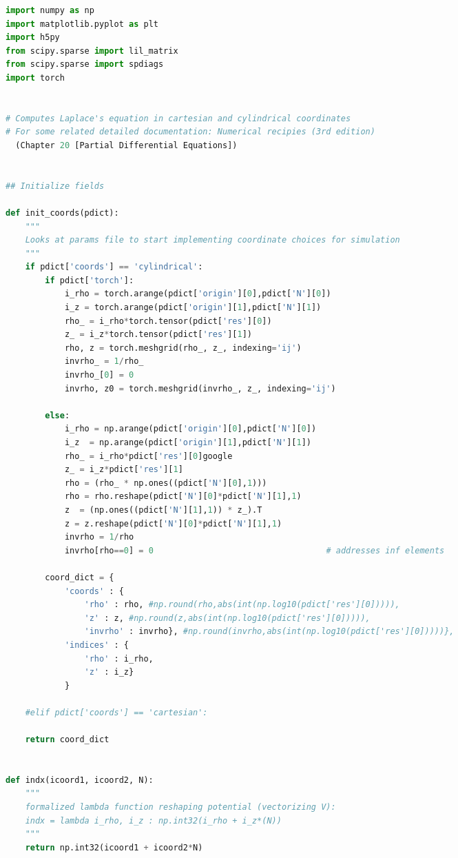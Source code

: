 \begin{spacing}{1}
\begin{lstlisting}[frame=single, language=Python]
import numpy as np
import matplotlib.pyplot as plt
import h5py
from scipy.sparse import lil_matrix
from scipy.sparse import spdiags
import torch


# Computes Laplace's equation in cartesian and cylindrical coordinates
# For some related detailed documentation: Numerical recipies (3rd edition) 
  (Chapter 20 [Partial Differential Equations])


## Initialize fields

def init_coords(pdict):
    """ 
    Looks at params file to start implementing coordinate choices for simulation
    """
    if pdict['coords'] == 'cylindrical':
        if pdict['torch']:
            i_rho = torch.arange(pdict['origin'][0],pdict['N'][0])
            i_z = torch.arange(pdict['origin'][1],pdict['N'][1])
            rho_ = i_rho*torch.tensor(pdict['res'][0])
            z_ = i_z*torch.tensor(pdict['res'][1])
            rho, z = torch.meshgrid(rho_, z_, indexing='ij')
            invrho_ = 1/rho_
            invrho_[0] = 0
            invrho, z0 = torch.meshgrid(invrho_, z_, indexing='ij')
            
        else:
            i_rho = np.arange(pdict['origin'][0],pdict['N'][0])
            i_z  = np.arange(pdict['origin'][1],pdict['N'][1])                                          
            rho_ = i_rho*pdict['res'][0]google
            z_ = i_z*pdict['res'][1]
            rho = (rho_ * np.ones((pdict['N'][0],1)))
            rho = rho.reshape(pdict['N'][0]*pdict['N'][1],1)
            z  = (np.ones((pdict['N'][1],1)) * z_).T
            z = z.reshape(pdict['N'][0]*pdict['N'][1],1)
            invrho = 1/rho
            invrho[rho==0] = 0                                   # addresses inf elements
            
        coord_dict = {
            'coords' : {
                'rho' : rho, #np.round(rho,abs(int(np.log10(pdict['res'][0])))),
                'z' : z, #np.round(z,abs(int(np.log10(pdict['res'][0])))),
                'invrho' : invrho}, #np.round(invrho,abs(int(np.log10(pdict['res'][0]))))},
            'indices' : {
                'rho' : i_rho,
                'z' : i_z}
            }
        
    #elif pdict['coords'] == 'cartesian': 
    
    return coord_dict
    

def indx(icoord1, icoord2, N):
    """
    formalized lambda function reshaping potential (vectorizing V):
    indx = lambda i_rho, i_z : np.int32(i_rho + i_z*(N))
    """
    return np.int32(icoord1 + icoord2*N)



\end{lstlisting}
\end{spacing}
